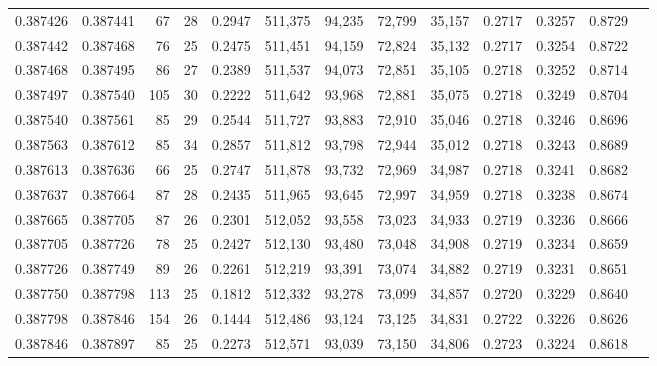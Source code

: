 \begin{tabular}{rrrrrrrrrrrrr}
0.387426 & 0.387441 &    67 &  28 &                                     0.2947 & 511,375 &  94,235 &  72,799 &  35,157 & 0.2717 & 0.3257 & 0.8729 \\
0.387442 & 0.387468 &    76 &  25 &                                     0.2475 & 511,451 &  94,159 &  72,824 &  35,132 & 0.2717 & 0.3254 & 0.8722 \\
0.387468 & 0.387495 &    86 &  27 &                                     0.2389 & 511,537 &  94,073 &  72,851 &  35,105 & 0.2718 & 0.3252 & 0.8714 \\
0.387497 & 0.387540 &   105 &  30 &                                     0.2222 & 511,642 &  93,968 &  72,881 &  35,075 & 0.2718 & 0.3249 & 0.8704 \\
0.387540 & 0.387561 &    85 &  29 &                                     0.2544 & 511,727 &  93,883 &  72,910 &  35,046 & 0.2718 & 0.3246 & 0.8696 \\
0.387563 & 0.387612 &    85 &  34 &                                     0.2857 & 511,812 &  93,798 &  72,944 &  35,012 & 0.2718 & 0.3243 & 0.8689 \\
0.387613 & 0.387636 &    66 &  25 &                                     0.2747 & 511,878 &  93,732 &  72,969 &  34,987 & 0.2718 & 0.3241 & 0.8682 \\
0.387637 & 0.387664 &    87 &  28 &                                     0.2435 & 511,965 &  93,645 &  72,997 &  34,959 & 0.2718 & 0.3238 & 0.8674 \\
0.387665 & 0.387705 &    87 &  26 &                                     0.2301 & 512,052 &  93,558 &  73,023 &  34,933 & 0.2719 & 0.3236 & 0.8666 \\
0.387705 & 0.387726 &    78 &  25 &                                     0.2427 & 512,130 &  93,480 &  73,048 &  34,908 & 0.2719 & 0.3234 & 0.8659 \\
0.387726 & 0.387749 &    89 &  26 &                                     0.2261 & 512,219 &  93,391 &  73,074 &  34,882 & 0.2719 & 0.3231 & 0.8651 \\
0.387750 & 0.387798 &   113 &  25 &                                     0.1812 & 512,332 &  93,278 &  73,099 &  34,857 & 0.2720 & 0.3229 & 0.8640 \\
0.387798 & 0.387846 &   154 &  26 &                                     0.1444 & 512,486 &  93,124 &  73,125 &  34,831 & 0.2722 & 0.3226 & 0.8626 \\
0.387846 & 0.387897 &    85 &  25 &                                     0.2273 & 512,571 &  93,039 &  73,150 &  34,806 & 0.2723 & 0.3224 & 0.8618 \\

\end{tabular}
